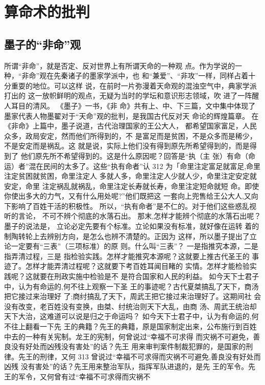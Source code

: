 \chapter{算命术的批判}
\section{墨子的“非命”观}
所谓“非命”，就是否定、反对世界上有所谓天命的一种观
点。作为学说的一种，“非命”观在先秦诸子的墨家学派中，也
和“兼爱”、“非攻”一样，同样占着十分重耍的地位。可以这样
说，在前时一片弥漫着天命观的混浊空气中，典家学派打出的
这一放帜鲜明的观点，无疑为当时的学坛和意识形志领域，吹
进了一阵醒人耳目的清风。
《墨子》一书，《非 命》共有上、中、下三篇，文中集中体现了
墨家代表人物墨翟对于“天命”观的批判，是我国古代反对天
命论的辉煌篇章。
在《非命》上篇中，墨子说道，古代治理国家的王公大人，
都希望国家富足，人民众多，政局安定，然而他们所得到的，不
是富足而是贫困，不是众多而是稀少，不是安定而是祸乱。这
就是说，实际上他们没有得到原先所希望得到的，而是得到了
他们原先所不希望得到的。这是什么原因呢？回答是“执（主
张）有命（命运）者”混在民间的太多了。这些“执有命者”认
312 
为「命里注定富足就富足,命里注定贫困就贫困，命里注定人
多就人多，命里注定人少就人少，命里注定安定就安定，命里
注定祸乱就祸乱，命里注定长寿就长寿，命里注定短命就短
命。即使你使出多大的力气，又有什么用处呢?”他们既把这
一套向上兜售给王公大人,又向下影响了百姓干活的积极性。
所以，“执有命者”是不仁的。对于他们这些惑乱视听的言论，
不可不辨个彻底的水落石出。
那末,怎样才能辨个彻底的水落石出呢？墨子的说法是，
立论必定先要有个标准。立论如果没有标准，就好像在运转
着的制陶转轮上去辨别方向，是怎么也辨不清楚的。正因为
这样，所以墨子提出了立论一定要有“三表”（三项标准）的原
则。什么叫“三表”？ 一是指推究本源，二是指弄清过程，三是
指检验实践。怎样才能推究本源呢？这就要上推古代圣王的
事迹了。怎样才能弄清过程呢？这就要下考百姓耳闻目睹的
实情。怎样才能检验实践呢？这就要在刑政实施中检验是不
是符合国家和人民的利益。
如今天下士君子中，认为有命运的,何不往上观察一下圣
王的事迹呢？古代夏桀搞乱了天下，商汤把它接过来治理好
了;商纣搞乱了天下，周武王把它接过来治理好了。这期间社
会没有改变，老百姓没有变换，由桀、纣统治则天下大乱，由商
汤、周武王统治却天下大治，这难道可以说是归之于命运吗？
如今天下士君子中，认为有命运的,何不往上翻看一下先
王的典籍？先王的典籍，原是国家制定出来，公布施行到百姓
中去的一种有关宪制。龙王的宪制，何曾说过“幸福不可求得
而灾祸不可避免，善良没有好处而凶残没有害处”的话？先王
用来审判案件制裁犯罪的，是国家的刑律。先王的刑律，又何
 313 
曾说过“幸福不可求得而灾祸不可避免,善良没有好处而凶残
没有害处”的话？先王用来整治军队，指挥军队进退的，是先
王的军令。先王的军令，又何曾有过“幸福不可求得而灾祸不

